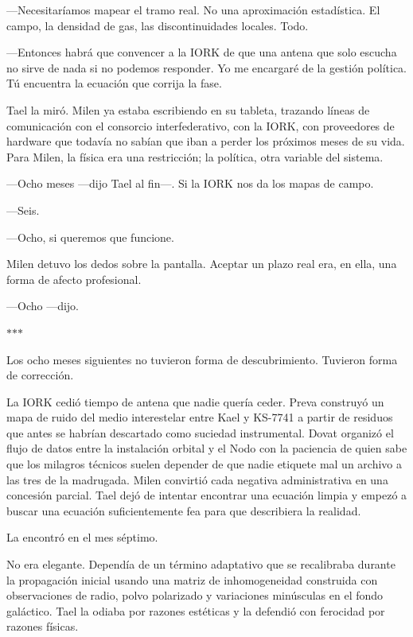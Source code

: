 \documentclass[11pt,a5paper,twoside]{book}
\begin{document}
—Necesitaríamos mapear el tramo real. No una aproximación estadística. El campo, la densidad de gas, las discontinuidades locales. Todo.

—Entonces habrá que convencer a la IORK de que una antena que solo escucha no sirve de nada si no podemos responder. Yo me encargaré de la gestión política. Tú encuentra la ecuación que corrija la fase.

Tael la miró. Milen ya estaba escribiendo en su tableta, trazando líneas de comunicación con el consorcio interfederativo, con la IORK, con proveedores de hardware que todavía no sabían que iban a perder los próximos meses de su vida. Para Milen, la física era una restricción; la política, otra variable del sistema.

—Ocho meses —dijo Tael al fin—. Si la IORK nos da los mapas de campo.

—Seis.

—Ocho, si queremos que funcione.

Milen detuvo los dedos sobre la pantalla. Aceptar un plazo real era, en ella, una forma de afecto profesional.

—Ocho —dijo.

\vspace{1.5em}
\begin{center}$\ast$\quad$\ast$\quad$\ast$\end{center}
\vspace{1.5em}

Los ocho meses siguientes no tuvieron forma de descubrimiento. Tuvieron forma de corrección.

La IORK cedió tiempo de antena que nadie quería ceder. Preva construyó un mapa de ruido del medio interestelar entre Kael y KS-7741 a partir de residuos que antes se habrían descartado como suciedad instrumental. Dovat organizó el flujo de datos entre la instalación orbital y el Nodo con la paciencia de quien sabe que los milagros técnicos suelen depender de que nadie etiquete mal un archivo a las tres de la madrugada. Milen convirtió cada negativa administrativa en una concesión parcial. Tael dejó de intentar encontrar una ecuación limpia y empezó a buscar una ecuación suficientemente fea para que describiera la realidad.

La encontró en el mes séptimo.

No era elegante. Dependía de un término adaptativo que se recalibraba durante la propagación inicial usando una matriz de inhomogeneidad construida con observaciones de radio, polvo polarizado y variaciones minúsculas en el fondo galáctico. Tael la odiaba por razones estéticas y la defendió con ferocidad por razones físicas.
\end{document}
